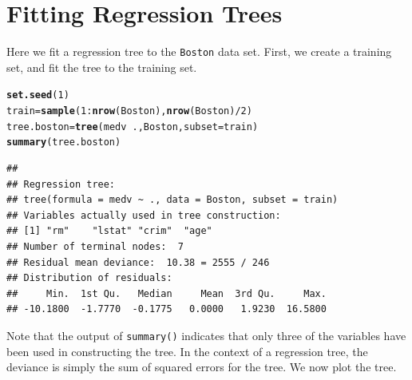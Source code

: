 \documentclass[12pt]{article}\usepackage[]{graphicx}\usepackage[]{color}
\makeatletter
\newcommand{\hlnum}[1]{\textcolor[rgb]{0.686,0.059,0.569}{#1}}%
\newcommand{\hlopt}[1]{\textcolor[rgb]{0,0,0}{#1}}%
\newcommand{\hlstd}[1]{\textcolor[rgb]{0.345,0.345,0.345}{#1}}%
\newcommand{\hlkwb}[1]{\textcolor[rgb]{0.69,0.353,0.396}{#1}}%
\newcommand{\hlkwc}[1]{\textcolor[rgb]{0.333,0.667,0.333}{#1}}%
\newcommand{\hlkwd}[1]{\textcolor[rgb]{0.737,0.353,0.396}{\textbf{#1}}}%
\newenvironment{kframe}{%
 \def\at@end@of@kframe{}%
 \ifinner\ifhmode%
  \def\at@end@of@kframe{\end{minipage}}%
  \begin{minipage}{\columnwidth}%
 \fi\fi%
 \def\FrameCommand##1{\hskip\@totalleftmargin \hskip-\fboxsep
 \colorbox{shadecolor}{##1}\hskip-\fboxsep
     \hskip-\linewidth \hskip-\@totalleftmargin \hskip\columnwidth}%
 \MakeFramed {\advance\hsize-\width
   \@totalleftmargin\z@ \linewidth\hsize
   \@setminipage}}%
 {\par\unskip\endMakeFramed%
 \at@end@of@kframe}
\newenvironment{knitrout}{}{} %
\makeatother
\begin{document}
\newpage
\section{Fitting Regression Trees}

Here we fit a regression tree to the \texttt{Boston} data set. First, we create a training set, and fit the tree to the training set.

\begin{knitrout}
\color{fgcolor}\begin{kframe}
\begin{alltt}
\hlkwd{set.seed}\hlstd{(}\hlnum{1}\hlstd{)}
\hlstd{train} \hlkwb{=} \hlkwd{sample}\hlstd{(}\hlnum{1}\hlopt{:}\hlkwd{nrow}\hlstd{(Boston),} \hlkwd{nrow}\hlstd{(Boston)}\hlopt{/}\hlnum{2}\hlstd{)}
\hlstd{tree.boston} \hlkwb{=} \hlkwd{tree}\hlstd{(medv}\hlopt{~}\hlstd{., Boston,} \hlkwc{subset}\hlstd{=train)}
\hlkwd{summary}\hlstd{(tree.boston)}
\end{alltt}
\begin{verbatim}
## 
## Regression tree:
## tree(formula = medv ~ ., data = Boston, subset = train)
## Variables actually used in tree construction:
## [1] "rm"    "lstat" "crim"  "age"  
## Number of terminal nodes:  7 
## Residual mean deviance:  10.38 = 2555 / 246 
## Distribution of residuals:
##     Min.  1st Qu.   Median     Mean  3rd Qu.     Max. 
## -10.1800  -1.7770  -0.1775   0.0000   1.9230  16.5800
\end{verbatim}
\end{kframe}
\end{knitrout}

Note that the output of \texttt{summary()} indicates that only three of the variables have been used in constructing the tree. In the context of a regression tree, the deviance is simply the sum of squared errors for the tree. We now plot the tree.
\end{document}
